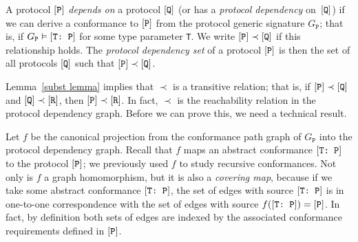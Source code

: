 \documentclass[../generics]{subfiles}
\begin{document}
\begin{definition}
A protocol $[\texttt{P}]$ \emph{depends on} a protocol $[\texttt{Q}]$ (or has a \emph{protocol dependency} on~$[\texttt{Q}]$) if we can derive a conformance to $[\texttt{P}]$ from the protocol generic signature $G_\texttt{P}$; that is, if $G_\texttt{P}\vDash[\texttt{T:~P}]$ for some type parameter \texttt{T}. We write $[\texttt{P}]\prec[\texttt{Q}]$ if this relationship holds. The \emph{protocol dependency set} of a protocol $[\texttt{P}]$ is then the set of all protocols $[\texttt{Q}]$ such that $[\texttt{P}]\prec[\texttt{Q}]$.
\end{definition}

Lemma~\ref{subst lemma} implies that $\prec$ is a transitive relation; that is, if $[\texttt{P}]\prec[\texttt{Q}]$ and $[\texttt{Q}]\prec[\texttt{R}]$, then $[\texttt{P}]\prec[\texttt{R}]$. In fact, $\prec$ is the reachability relation in the protocol dependency graph. Before we can prove this, we need a technical result.

\smallskip

Let $f$ be the canonical projection from the conformance path graph of $G_\texttt{P}$ into the protocol dependency graph. Recall that $f$ maps an abstract conformance $[\texttt{T:~P}]$ to the protocol $[\texttt{P}]$; we previously used $f$ to study recursive conformances. Not only is $f$ a graph homomorphism, but it is also a \emph{covering map}, because if we take some abstract conformance $[\texttt{T:~P}]$, the set of edges with source $[\texttt{T:~P}]$ is in one-to-one correspondence with the set of edges with source $f([\texttt{T:~P}])=[\texttt{P}]$. In fact, by definition both sets of edges are indexed by the associated conformance requirements defined in $[\texttt{P}]$.
\end{document}
